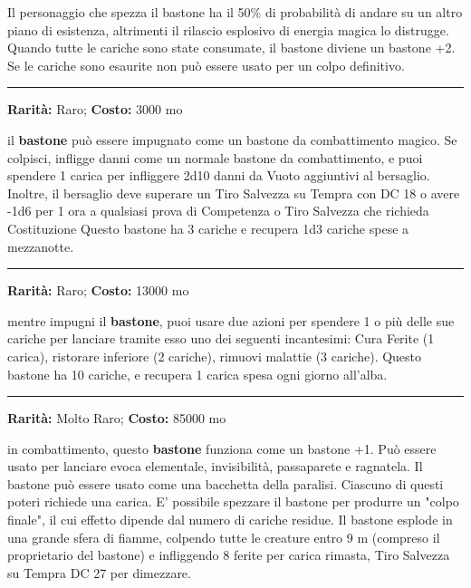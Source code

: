 \begin{multicols}{2}
Il personaggio che spezza il bastone ha il 50\% di probabilità di andare su un altro piano di esistenza, altrimenti il rilascio esplosivo di energia magica lo distrugge. Quando tutte le cariche sono state consumate, il bastone diviene un bastone +2. Se le cariche sono esaurite non può essere usato per un colpo definitivo.


\smallskip\noindent\rule{\linewidth}{2pt}  \hypertarget{Bastonedell'Avvizzimento}{}\medskip{}\noindent\label{Bastonedell'Avvizzimento}

\textbf{Rarità:} Raro; \textbf{Costo:} 3000 mo

il \textbf{bastone} può essere impugnato come un bastone da combattimento magico. Se colpisci, infligge danni come un normale bastone da combattimento, e puoi spendere 1 carica per infliggere 2d10 danni da Vuoto aggiuntivi al bersaglio. Inoltre, il bersaglio deve superare un Tiro Salvezza su Tempra con DC 18 o avere -1d6 per 1 ora a qualsiasi prova di Competenza o Tiro Salvezza che richieda Costituzione Questo bastone ha 3 cariche e recupera 1d3 cariche spese a mezzanotte.

\smallskip\noindent\rule{\linewidth}{2pt}  \hypertarget{BastonedellaGuarigione}{}\medskip{}\noindent\label{BastonedellaGuarigione}

\textbf{Rarità:} Raro; \textbf{Costo:} 13000 mo

mentre impugni il \textbf{bastone}, puoi usare due azioni per spendere 1 o più delle sue cariche per lanciare tramite esso uno dei seguenti incantesimi: Cura Ferite (1 carica), ristorare inferiore (2 cariche), rimuovi malattie (3 cariche). Questo bastone ha 10 cariche, e recupera 1 carica spesa ogni giorno all'alba.

\smallskip\noindent\rule{\linewidth}{2pt}  \hypertarget{BastonedellaStregoneria}{}\medskip{}\noindent\label{BastonedellaStregoneria}

\textbf{Rarità:} Molto Raro; \textbf{Costo:} 85000 mo

in combattimento, questo \textbf{bastone} funziona come un bastone +1. Può essere usato per lanciare evoca elementale, invisibilità, passaparete e ragnatela. Il bastone può essere usato come una bacchetta della paralisi. Ciascuno di questi poteri richiede una carica. E' possibile spezzare il bastone per produrre un "colpo finale", il cui effetto dipende dal numero di cariche residue. Il bastone esplode in una grande sfera di fiamme, colpendo tutte le creature entro 9 m (compreso il proprietario del bastone) e infliggendo 8 ferite per carica rimasta, Tiro Salvezza su Tempra DC 27 per dimezzare.


\end{multicols}

